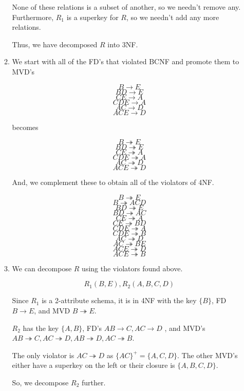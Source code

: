 \documentclass[12pt,letterpaper]{article}
\newcommand{\closure}[1]{\{#1\}^+}
\begin{document}
\begin{enumerate}
\begin{enumerate}
          None of these relations is a subset of another, so we needn't remove any.
          Furthermore, $R_1$ is a superkey for $R$, so we needn't add any more relations.

          Thus, we have decomposed $R$ into 3NF.

        \item
          We start with all of the FD's that violated BCNF and promote them to MVD's

          \[B \rightarrow E\]
          \[BD \rightarrow E\]
          \[CE \rightarrow A\]
          \[CDE \rightarrow A\]
          \[AC \rightarrow D\]
          \[ACE \rightarrow D\]

          becomes

          \[B \twoheadrightarrow E\]
          \[BD \twoheadrightarrow E\]
          \[CE \twoheadrightarrow A\]
          \[CDE \twoheadrightarrow A\]
          \[AC \twoheadrightarrow D\]
          \[ACE \twoheadrightarrow D\]

          And, we complement these to obtain all of the violators of 4NF.

          \[B \twoheadrightarrow E\]
          \[B \twoheadrightarrow ACD\]
          \[BD \twoheadrightarrow E\]
          \[BD \twoheadrightarrow AC\]
          \[CE \twoheadrightarrow A\]
          \[CE \twoheadrightarrow BD\]
          \[CDE \twoheadrightarrow A\]
          \[CDE \twoheadrightarrow B\]
          \[AC \twoheadrightarrow D\]
          \[AC \twoheadrightarrow BE\]
          \[ACE \twoheadrightarrow D\]
          \[ACE \twoheadrightarrow B\]

        \item
          We can decompose $R$ using the violators found above.

          \[R_1(B,E), R_2(A,B,C,D)\]

          Since $R_1$ is a 2-attribute schema,
          it is in 4NF with the key $\{B\}$, FD $B \rightarrow E$, and MVD $B \twoheadrightarrow E$.

          $R_2$ has the key $\{A,B\}$, FD's $AB \rightarrow C, AC \rightarrow D$
          , and MVD's $AB \twoheadrightarrow C, AC \twoheadrightarrow D, AB \twoheadrightarrow D, AC \twoheadrightarrow B$.

          The only violator is $AC \twoheadrightarrow D$ as $\closure{AC} = \{A, C, D\}$.
          The other MVD's either have a superkey on the left or their closure is $\{A, B, C, D\}$.

          So, we decompose $R_2$ further.


\end{enumerate}
\end{enumerate}
\end{document}
